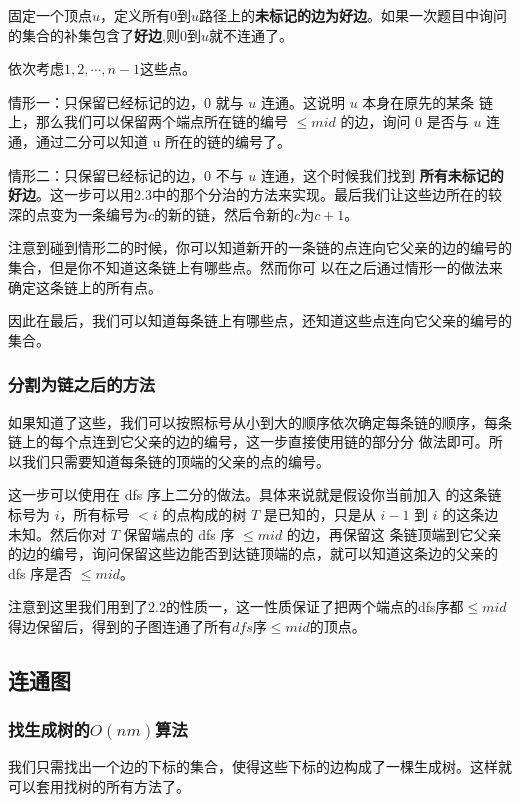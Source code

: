 \documentclass{noithesis}
\begin{document}
固定一个顶点$u$，定义所有$0$到$u$路径上的\textbf{未标记的边为好边}。如果一次题目中询问的集合的补集包含了\textbf{好边},则$0$到$u$就不连通了。

依次考虑$1, 2, \cdots, n - 1$这些点。

情形一：只保留已经标记的边，$0$ 就与 $u$ 连通。这说明 $u$ 本身在原先的某条
链上，那么我们可以保留两个端点所在链的编号 $\leq mid$ 的边，询问 $0$ 是否与 $u$
连通，通过二分可以知道 u 所在的链的编号了。

情形二：只保留已经标记的边，$0$ 不与 $u$ 连通，这个时候我们找到 \textbf{所有未标记的好边}。这一步可以用2.3中的那个分治的方法来实现。最后我们让这些边所在的较深的点变为一条编号为$c$的新的链，然后令新的$c$为$c + 1$。

注意到碰到情形二的时候，你可以知道新开的一条链的点连向它父亲的边的编号的集合，但是你不知道这条链上有哪些点。然而你可
以在之后通过情形一的做法来确定这条链上的所有点。

因此在最后，我们可以知道每条链上有哪些点，还知道这些点连向它父亲的编号的集合。

\subsubsection{分割为链之后的方法}

如果知道了这些，我们可以按照标号从小到大的顺序依次确定每条链的顺序，每条链上的每个点连到它父亲的边的编号，这一步直接使用链的部分分
做法即可。所以我们只需要知道每条链的顶端的父亲的点的编号。

这一步可以使用在 dfs 序上二分的做法。具体来说就是假设你当前加入
的这条链标号为 $i$，所有标号 $<i$ 的点构成的树 $T$ 是已知的，只是从 $i - 1$ 到 $i$ 的这条边未知。然后你对 $T$ 保留端点的 dfs 序 $\leq mid$ 的边，再保留这
条链顶端到它父亲的边的编号，询问保留这些边能否到达链顶端的点，就可以知道这条边的父亲的 dfs 序是否 $\leq mid$。

注意到这里我们用到了$2.2$的性质一，这一性质保证了把两个端点的dfs序都$\leq mid$得边保留后，得到的子图连通了所有$dfs$序$\leq mid$的顶点。

\subsection{连通图}

\subsubsection{找生成树的$O(nm)$算法}

我们只需找出一个边的下标的集合，使得这些下标的边构成了一棵生成树。这样就可以套用找树的所有方法了。
\end{document}
